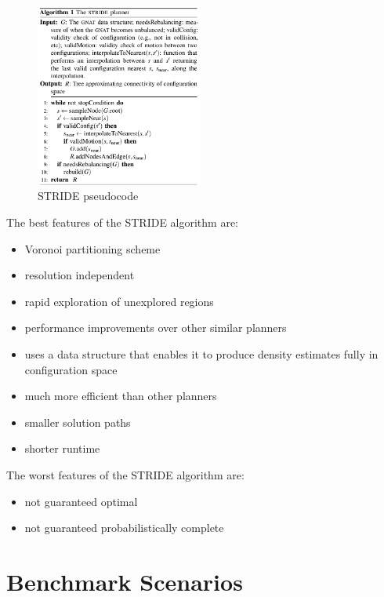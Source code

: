 \documentclass[conference]{IEEEtran} \usepackage[T1]{fontenc} \usepackage[backend=biber, style=ieee]{biblatex}
\begin{document}
\begin{figure}
\label{figure10} 
\centering 
\includegraphics[width=0.49\textwidth]{stride}
\caption{STRIDE pseudocode}
\end{figure}

The best features of the STRIDE algorithm are:
\begin{itemize}
 \item Voronoi partitioning scheme
 \item resolution independent
 \item rapid exploration of unexplored regions
 \item performance improvements over other similar planners
 \item uses a data structure that enables it to produce density estimates fully in configuration space
 \item much more efficient than other planners
 \item smaller solution paths
 \item shorter runtime
\end{itemize}

The worst features of the STRIDE algorithm are:
\begin{itemize}
 \item not guaranteed optimal
 \item not guaranteed probabilistically complete
\end{itemize}

\section{Benchmark Scenarios} \label{Benchmark Scenarios}
\end{document}
